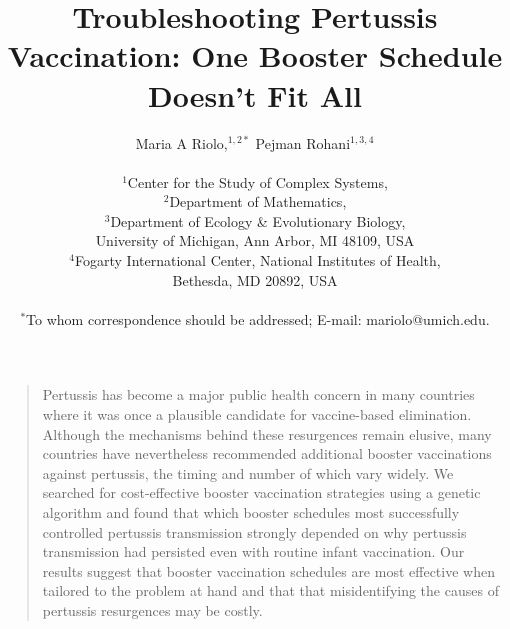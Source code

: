 \documentclass[12pt]{article}
\title{Troubleshooting Pertussis Vaccination: One Booster Schedule Doesn't Fit All}
\author
{Maria A Riolo,$^{1,2\ast}$ Pejman Rohani$^{1,3,4}$\\
\\
\normalsize{$^{1}$Center for the Study of Complex Systems,}\\
\normalsize{$^{2}$Department of Mathematics,}\\
\normalsize{$^{3}$Department of Ecology \& Evolutionary Biology,}\\
\normalsize{University of Michigan, Ann Arbor, MI 48109, USA}\\
\normalsize{$^{4}$Fogarty International Center, National Institutes of Health,}\\
\normalsize{Bethesda, MD 20892, USA}\\
\\
\normalsize{$^\ast$To whom correspondence should be addressed; E-mail:  mariolo@umich.edu.}
}
\date{}
\newenvironment{sciabstract}{%
\begin{quote} \bf}
{\end{quote}}
\begin{document}
 


\baselineskip24pt


\maketitle 




\begin{sciabstract}
  


Pertussis has become a major public health concern in many countries
where it was once a plausible candidate for vaccine-based elimination.
Although the mechanisms behind these resurgences remain elusive,
many countries have nevertheless recommended additional
booster vaccinations against pertussis, the timing and number of which vary widely.
We searched for cost-effective booster vaccination strategies
using a genetic algorithm
and found that which booster schedules most successfully controlled pertussis transmission
strongly depended on why pertussis transmission had persisted even with routine infant vaccination.
Our results suggest that booster vaccination schedules are most effective when tailored to the problem at hand
and that that misidentifying the causes of pertussis resurgences may be costly.
\end{sciabstract}



\end{document}
